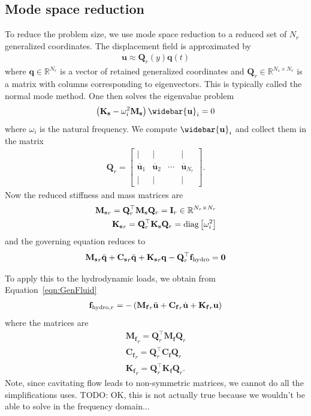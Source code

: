 \documentclass[10pt]{article}
\newcommand{\mbf}[1]{\mathbf{#1}}
\newcommand{\be}{\begin{eqnarray}}
\newcommand{\ee}{\end{eqnarray}}
\newcommand{\tn}[1]{\textnormal{#1}}
\begin{document}
% 
\subsection{Mode space reduction}
%
To reduce the problem size, we use mode space reduction to a reduced set of $N_r$ generalized coordinates.
The displacement field is approximated by
%
\be
\mbf{u} \approx \mbf{Q}_r(y) \mbf{q}(t)
\ee
%
where $\mbf{q} \in \mathbb{R}^{N_r}$ is a vector of retained generalized coordinates and $\mbf{Q}_r \in \mathbb{R}^{N_s \times N_r}$ is a matrix with columns corresponding to eigenvectors.
This is typically called the normal mode method.
One then solves the eigenvalue problem
%
\be
\left( \mbf{K_s} - \omega_i^2 \mbf{M_s}
\right)
\widebar{  \mbf{u} }_i = 0
\ee
%
where $\omega_i$ is the natural frequency.
We compute $\widebar{  \mbf{u} }_i$ and collect them in the matrix
%
\be
\mbf{Q}_r=\left[\begin{array}{cccc}
        \mid                 & \mid                 &        & \mid                     \\
        \overline{\mbf{u}}_1 & \overline{\mbf{u}}_2 & \cdots & \overline{\mbf{u}}_{N_r} \\
        \mid                 & \mid                 &        & \mid
    \end{array}\right]
.
\ee
%
Now the reduced stiffness and mass matrices are
%
\be
\mbf{M_s}_r = \mbf{Q}_r^{\top} \mbf{M_s} \mbf{Q}_r = \mbf{I}_r \in \mathbb{R}^{N_r \times N_r} \\
\mbf{K_s}_r = \mbf{Q}_r^{\top} \mbf{K_s} \mbf{Q}_r = \tn{diag}\left[ \omega_i^2   \right]
\ee
%
and the governing equation reduces to
%
\be
\mbf{M_s}_r \ddot{\mbf{q}} + \mbf{C_s}_r \ddot{\mbf{q}} + \mbf{K_s}_r \mbf{q} - \mbf{Q}_r^{\top} \mbf{f}_{\tn{hydro}} = \mbf{0}
\ee
%

To apply this to the hydrodynamic loads, we obtain from Equation~\eqref{eqn:GenFluid}
%
\be
\mbf{f}_{\tn{hydro},r} =
-\left( \mbf{M_f}_r \ddot{\mbf{u}} + \mbf{C_f}_r \dot{\mbf{u}} + \mbf{K_f}_r \mbf{u}\right)
\ee
%
where the matrices are
%
\be
\mbf{M_f}_r = \mbf{Q}_r^{\top} \mbf{M_f} \mbf{Q}_r \\
\mbf{C_f}_r = \mbf{Q}_r^{\top} \mbf{C_f} \mbf{Q}_r \\
\mbf{K_f}_r = \mbf{Q}_r^{\top} \mbf{K_f} \mbf{Q}_r.
\ee
Note, since cavitating flow leads to non-symmetric matrices, we cannot do all the simplifications \citet{Jonsson2017a} uses.
TODO: OK, this is not actually true because we wouldn't be able to solve in the frequency domain...
\end{document}
